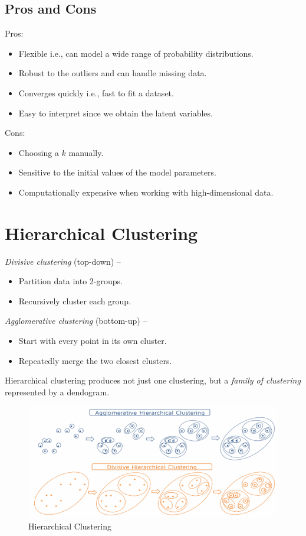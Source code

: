 \documentclass[
	number={6},
	title={Clustering}
]{cs584notes}
\begin{document}
\subsection{Pros and Cons}\label{subsec:gmm-pros-and-cons}
Pros:
\begin{itemize}
	\item Flexible i.e., can model a wide range of probability distributions.
	\item Robust to the outliers and can handle missing data.
	\item Converges quickly i.e., fast to fit a dataset.
	\item Easy to interpret since we obtain the latent variables.
\end{itemize}
Cons:
\begin{itemize}
	\item Choosing a $k$ manually.
	\item Sensitive to the initial values of the model parameters.
	\item Computationally expensive when working with high-dimensional data.
\end{itemize}

\section{Hierarchical Clustering}\label{sec:hierarchical-clustering}
\emph{Divisive clustering} (top-down) --
\begin{itemize}
	\item Partition data into 2-groups.
	\item Recursively cluster each group.
\end{itemize}

\emph{Agglomerative clustering} (bottom-up) --
\begin{itemize}
	\item Start with every point in its own cluster.
	\item Repeatedly merge the two closest clusters.
\end{itemize}

Hierarchical clustering produces not just one clustering, but a \emph{family of clustering} represented by a dendogram.

\begin{figure}[H]
	\centering
	\includegraphics[width=\textwidth]{figures/6/hierarchical_clusterings}
	\caption{Hierarchical Clustering}
	\label{fig:hierarchical-clusterings}
\end{figure}
\end{document}
